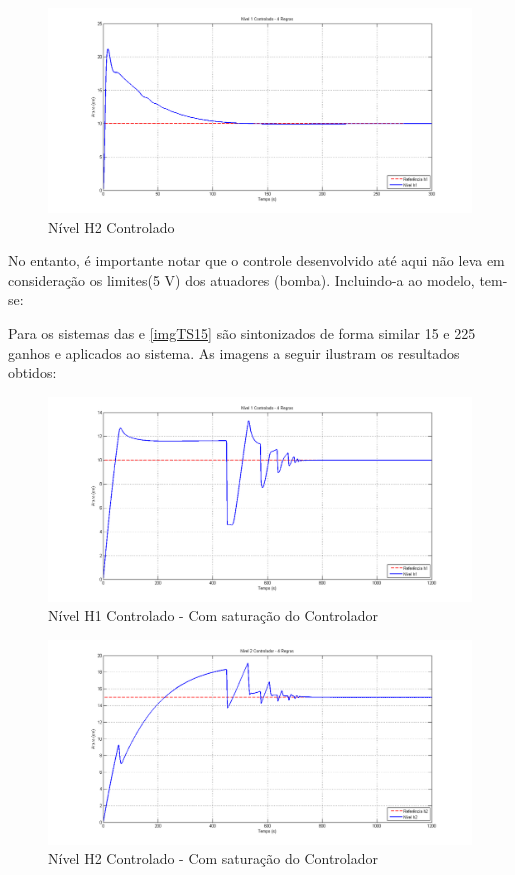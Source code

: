 \begin{figure}[H]
	\centering
	\includegraphics[width=\textwidth]{img/nm_ctrl_h2ts2_free.png}
	\caption{Nível H2 Controlado }
	\label{figH2CtrlTS2_free_nm}
\end{figure}

No entanto, é importante notar que o controle desenvolvido até aqui não leva em consideração os limites(5 V) dos atuadores (bomba). Incluindo-a ao modelo, tem-se:

Para os sistemas das  e \ref{imgTS15} são sintonizados de forma similar 15 e 225 ganhos e aplicados ao sistema. As imagens a seguir ilustram os resultados obtidos:
\begin{figure}[H]
	\centering
	\includegraphics[width=\textwidth]{img/nm_ctrl_h1ts2_ulim.png}
	\caption{\small Nível H1 Controlado - Com saturação do Controlador }
	\label{figH1TSCtrl2_ulim_nm}
\end{figure}

\begin{figure}[H]
	\centering
	\includegraphics[width=\textwidth]{img/nm_ctrl_h2ts2_ulim.png}
	\caption{Nível H2 Controlado - Com saturação do Controlador }
	\label{figH2CtrlTS2_ulim_nm}
\end{figure}

